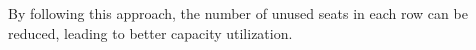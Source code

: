 By following this approach, the number of unused seats in each row can be reduced, leading to better capacity utilization.















